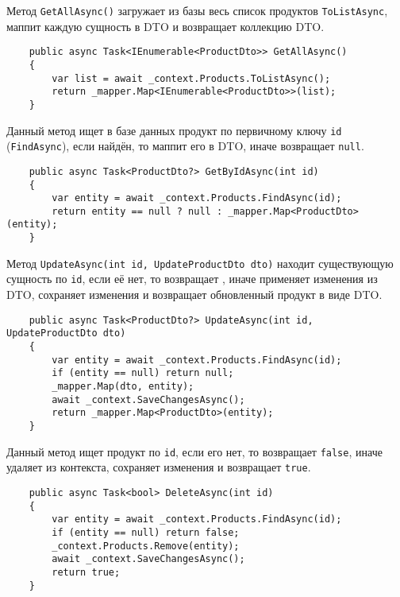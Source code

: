 \documentclass[a4paper,12pt]{report}
\begin{document}
Метод \texttt{GetAllAsync()} загружает из базы весь список продуктов \texttt{ToListAsync}, маппит каждую 
сущность в \acs{DTO} и возвращает коллекцию \acs{DTO}.
\begin{verbatim}
    public async Task<IEnumerable<ProductDto>> GetAllAsync()
    {
        var list = await _context.Products.ToListAsync();
        return _mapper.Map<IEnumerable<ProductDto>>(list);
    }
\end{verbatim}

Данный метод ищет в базе данных продукт по первичному ключу \texttt{id} (\texttt{FindAsync}), 
если найдён, то маппит его в \acs{DTO}, иначе возвращает \texttt{null}.
\begin{verbatim}
    public async Task<ProductDto?> GetByIdAsync(int id)
    {
        var entity = await _context.Products.FindAsync(id);
        return entity == null ? null : _mapper.Map<ProductDto>(entity);
    }
\end{verbatim}

Метод \texttt{UpdateAsync(int id, UpdateProductDto dto)} находит существующую сущность по \texttt{id}, если её нет, то возвращает , 
иначе применяет изменения из \acs{DTO}, сохраняет изменения и возвращает обновленный продукт в виде \acs{DTO}.
\begin{verbatim}
    public async Task<ProductDto?> UpdateAsync(int id, UpdateProductDto dto)
    {
        var entity = await _context.Products.FindAsync(id);
        if (entity == null) return null;
        _mapper.Map(dto, entity);
        await _context.SaveChangesAsync();
        return _mapper.Map<ProductDto>(entity);
    }
\end{verbatim}

Данный метод ищет продукт по \texttt{id}, если его нет, то возвращает \texttt{false}, 
иначе удаляет из контекста, сохраняет изменения и возвращает \texttt{true}.
\begin{verbatim}
    public async Task<bool> DeleteAsync(int id)
    {
        var entity = await _context.Products.FindAsync(id);
        if (entity == null) return false;
        _context.Products.Remove(entity);
        await _context.SaveChangesAsync();
        return true;
    }
\end{verbatim}
\end{document}
